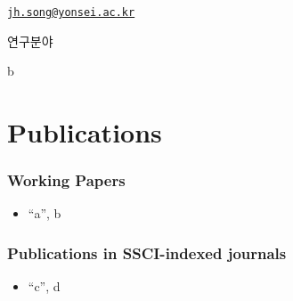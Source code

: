 \documentclass[
]{book}
\providecommand{\tightlist}{%
  \setlength{\itemsep}{0pt}\setlength{\parskip}{0pt}}
\begin{document}
\href{mailto:jh.song@yonsei.ac.kr}{\nolinkurl{jh.song@yonsei.ac.kr}}

연구분야

b

\hypertarget{publications-1}{%
\chapter*{Publications}\label{publications-1}}

\hypertarget{working-papers}{%
\subsection*{Working Papers}\label{working-papers}}

\begin{itemize}
\tightlist
\item
  ``a'', b
\end{itemize}

\hypertarget{publications-in-ssci-indexed-journals}{%
\subsection*{Publications in SSCI-indexed journals}\label{publications-in-ssci-indexed-journals}}

\begin{itemize}
\tightlist
\item
  ``c'', d
\end{itemize}

  
\end{document}
